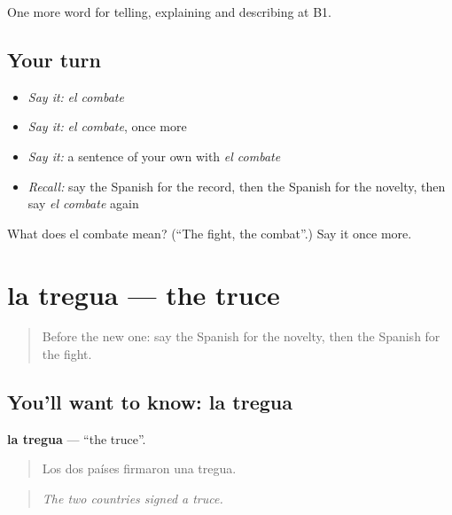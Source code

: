 \begin{grammarlens}[title={What you've built}]
One more word for telling, explaining and describing at B1.
\end{grammarlens}

\subsection*{Your turn}
\begin{itemize}
\raggedright
  \item \emph{Say it:} \emph{el combate}
  \item \emph{Say it:} \emph{el combate}, once more
  \item \emph{Say it:} a sentence of your own with \emph{el combate}
  \item \emph{Recall:} say the Spanish for the record, then the Spanish for the novelty, then say \emph{el combate} again
\end{itemize}

\begin{tcolorbox}[breakable,colback=teal!4,colframe=teal!35!black,title={Before you move on}]
What does el combate mean? (\textquotedblleft{}The fight, the combat\textquotedblright{}.) Say it once more.
\end{tcolorbox}
\section[la tregua]{la tregua — the truce}

\label{lesson:ES-C567-tregua}



\begin{quote}
Before the new one: say the Spanish for the novelty, then the Spanish for the fight.
\end{quote}

\subsection*{You'll want to know: la tregua}
\textbf{la tregua} — \textquotedblleft{}the truce\textquotedblright{}.

\begin{quote}
Los dos países firmaron una tregua.
\end{quote}

\begin{quote}
\emph{The two countries signed a truce.}
\end{quote}

